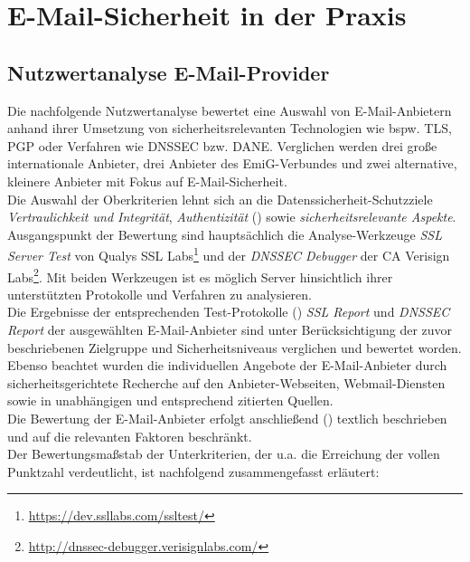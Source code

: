 \documentclass  [paper=a4,
				fontsize=12pt,
				listof=totoc,
				bibliography=totoc
				]{scrreprt}
\begin{document}
	\chapter{E-Mail-Sicherheit in der Praxis}\label{chap:e-mail-sicherheit-in-der-praxis}
		\section{Nutzwertanalyse E-Mail-Provider}
		\label{sec:nwa}
			Die nachfolgende Nutzwertanalyse bewertet eine Auswahl von E-Mail-Anbietern anhand ihrer Umsetzung von sicherheitsrelevanten Technologien wie bspw. \ac{TLS}, \ac{PGP} oder Verfahren wie \ac{DNSSEC} bzw. \ac{DANE}.
			Verglichen werden drei große internationale Anbieter, drei Anbieter des \ac{EmiG}-Verbundes und zwei alternative, kleinere Anbieter mit Fokus auf E-Mail-Sicherheit.\\		
			Die Auswahl der Oberkriterien lehnt sich an die Datenssicherheit-Schutzziele \textit{Vertraulichkeit und Integrität}, \textit{Authentizität} () sowie \textit{sicherheitsrelevante Aspekte}.\\
			Ausgangspunkt der Bewertung sind hauptsächlich die Analyse-Werkzeuge \textit{SSL Server Test} von Qualys SSL Labs\footnote{\url{https://dev.ssllabs.com/ssltest/}} und der \textit{DNSSEC Debugger} der \ac{CA} Verisign Labs\footnote{\url{http://dnssec-debugger.verisignlabs.com/}}.
			Mit beiden Werkzeugen ist es möglich Server hinsichtlich ihrer unterstützten Protokolle und Verfahren zu analysieren.\medskip\\
			Die Ergebnisse der entsprechenden Test-Protokolle () \textit{SSL Report} und \textit{DNSSEC Report} der ausgewählten E-Mail-Anbieter sind unter Berücksichtigung der zuvor beschriebenen Zielgruppe und Sicherheitsniveaus verglichen und bewertet worden.\\
			Ebenso beachtet wurden die individuellen Angebote der E-Mail-Anbieter durch sicherheitsgerichtete Recherche auf den Anbieter-Webseiten, Webmail-Diensten sowie in unabhängigen und entsprechend zitierten Quellen.\\
			Die Bewertung der E-Mail-Anbieter erfolgt anschließend () textlich beschrieben und auf die relevanten Faktoren beschränkt.\medskip\\
			Der Bewertungsmaßstab der Unterkriterien, der u.a. die Erreichung der vollen Punktzahl verdeutlicht, ist nachfolgend zusammengefasst erläutert:
			
\end{document}
